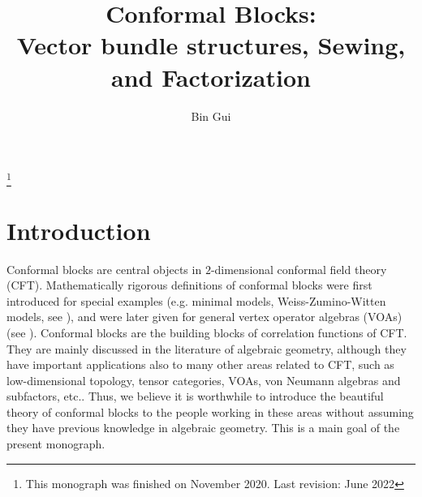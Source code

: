 \documentclass[12pt,a4paper,notitlepage]{report}
\title{Conformal Blocks:\\[0.5ex] \large Vector bundle structures, Sewing, and Factorization}
\author{{\sc Bin Gui}
}
\date{}
\theoremstyle{definition}
\theoremstyle{plain}
\numberwithin{equation}{section}
\begin{document}
\sloppy %



	\maketitle


\newcommand\blfootnote[1]{%
	\begingroup
	\renewcommand\thefootnote{}\footnote{#1}%
	\addtocounter{footnote}{-1}%
	\endgroup
}




\vspace{-0.5cm}
\blfootnote{This monograph was finished on November 2020. Last revision: June 2022}

\makeatletter
\newcommand*{\toccontents}{}
\makeatother
\toccontents
	












	
	
	
\chapter*{Introduction}	
	
	
	
Conformal blocks are central objects in  $2$-dimensional conformal field theory (CFT). Mathematically rigorous definitions of conformal blocks were first introduced for special examples (e.g. minimal models, Weiss-Zumino-Witten models, see \cite{BFM91,TUY89}), and were later given for general vertex operator algebras (VOAs) (see \cite{Zhu94,FB04}). Conformal blocks  are the building blocks of correlation functions of CFT. They are mainly discussed in the literature of algebraic geometry, although they have important applications also to many other areas related to CFT, such as low-dimensional topology, tensor categories, VOAs, von Neumann algebras and subfactors, etc.. Thus, we believe it is worthwhile to introduce the beautiful theory of conformal blocks to the people working in these areas without assuming they have previous knowledge in algebraic geometry. This is a main goal of the present monograph.
\end{document}
